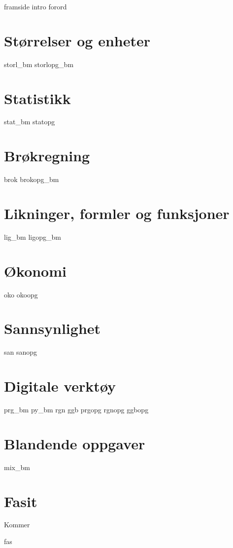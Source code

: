 




{framside}
{intro}
{forord}

\tableofcontents

\chapter{Størrelser og enheter}
\newpage
{storl_bm}
\opgt
{storlopg_bm}

\chapter{Statistikk}
\newpage
{stat_bm}
{statopg}

\chapter{Brøkregning \label{Br}}
\newpage
{brok}
\newpage
{brokopg_bm}

\chapter{Likninger, formler og funksjoner \label{Lig}}
\newpage
{lig_bm}
{ligopg_bm}

\chapter{Økonomi \label{Oko}}
\newpage
{oko}
{okoopg}

\chapter{Sannsynlighet \label{San}} 
\newpage
{san}
{sanopg}

\chapter{Digitale verktøy}
{prg_bm}
{py_bm}
{rgn}	
{ggb}	
\opgt
{prgopg}
{rgnopg}	
{ggbopg}	

\chapter{Blandende oppgaver}
{mix_bm}



\chapter*{Fasit}
Kommer

{fas}






